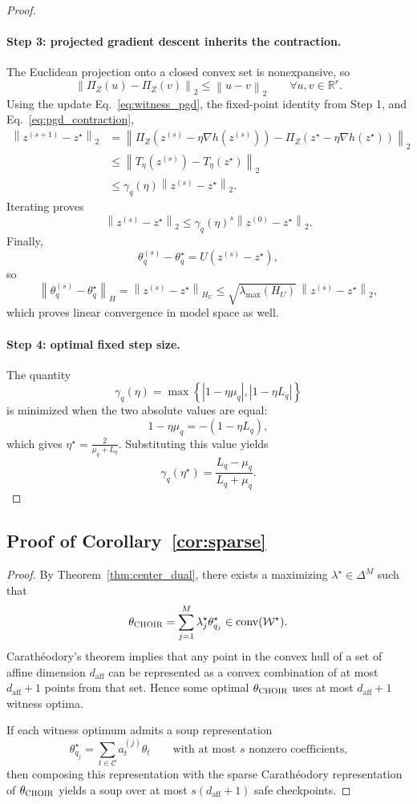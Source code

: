 \documentclass{article}
\newcommand{\RR}{\mathbb{R}}
\newcommand{\cC}{\mathcal{C}}
\newcommand{\cW}{\mathcal{W}}
\newcommand{\aff}{\mathrm{aff}}
\newcommand{\conv}{\operatorname{conv}}
\newcommand{\simplex}{\Delta}
\newcommand{\choir}{\textup{\textsc{CHOIR}}}
\newcommand{\norm}[1]{\left\lVert #1 \right\rVert}
\newcommand{\abs}[1]{\left\lvert #1 \right\rvert}
\newcommand{\paren}[1]{\left( #1 \right)}
\newcommand{\braces}[1]{\left\{ #1 \right\}}
\begin{document}
\begin{proof}
\paragraph{Step 3: projected gradient descent inherits the contraction.}
The Euclidean projection onto a closed convex set is nonexpansive, so
\[
\norm{\Pi_Z(u)-\Pi_Z(v)}_2
\le
\norm{u-v}_2
\qquad
\forall u,v\in\RR^{r}.
\]
Using the update Eq.~\eqref{eq:witness_pgd}, the fixed-point identity from Step 1, and Eq.~\eqref{eq:pgd_contraction},
\begin{align*}
\norm{z^{(s+1)}-z^\star}_2
&=
\norm{
\Pi_Z\paren{z^{(s)}-\eta \nabla h(z^{(s)})}
-
\Pi_Z\paren{z^\star-\eta \nabla h(z^\star)}
}_2 \\
&\le
\norm{
T_\eta\paren{z^{(s)}}-T_\eta(z^\star)
}_2 \\
&\le
\gamma_q(\eta)\norm{z^{(s)}-z^\star}_2.
\end{align*}
Iterating proves
\[
\norm{z^{(s)}-z^\star}_2
\le
\gamma_q(\eta)^s \norm{z^{(0)}-z^\star}_2.
\]
Finally,
\[
\theta_q^{(s)}-\theta_q^\star
=
U\paren{z^{(s)}-z^\star},
\]
so
\[
\norm{\theta_q^{(s)}-\theta_q^\star}_H
=
\norm{z^{(s)}-z^\star}_{H_U}
\le
\sqrt{\lambda_{\max}(H_U)}\,\norm{z^{(s)}-z^\star}_2,
\]
which proves linear convergence in model space as well.

\paragraph{Step 4: optimal fixed step size.}
The quantity
\[
\gamma_q(\eta)=\max\braces{\abs{1-\eta\mu_q},\abs{1-\eta L_q}}
\]
is minimized when the two absolute values are equal:
\[
1-\eta\mu_q = -(1-\eta L_q),
\]
which gives \(\eta^\star = \frac{2}{\mu_q+L_q}\). Substituting this value yields
\[
\gamma_q(\eta^\star)
=
\frac{L_q-\mu_q}{L_q+\mu_q}.
\]
\end{proof}

\subsection{Proof of Corollary~\ref{cor:sparse}}

\begin{proof}
By Theorem~\ref{thm:center_dual}, there exists a maximizing \(\lambda^\star \in \simplex^M\) such that
\[
\theta_{\choir}
=
\sum_{j=1}^{M}\lambda_j^\star \theta_{q_j}^\star
\in
\conv(\cW^\star).
\]
Carath\'eodory's theorem implies that any point in the convex hull of a set of affine dimension \(d_{\aff}\) can be represented as a convex combination of at most \(d_{\aff}+1\) points from that set. Hence some optimal \(\theta_{\choir}\) uses at most \(d_{\aff}+1\) witness optima.

If each witness optimum admits a soup representation
\[
\theta_{q_j}^\star
=
\sum_{t\in \cC} a_t^{(j)} \theta_t
\qquad
\text{with at most \(s\) nonzero coefficients,}
\]
then composing this representation with the sparse Carath\'eodory representation of \(\theta_{\choir}\) yields a soup over at most \(s(d_{\aff}+1)\) safe checkpoints.
\end{proof}
\end{document}
